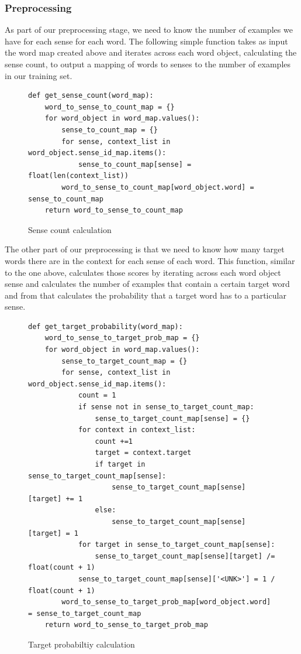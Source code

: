 \documentclass[11pt]{article}
\begin{document}
\subsubsection{Preprocessing}
As part of our preprocessing stage, we need to know the number of examples we have for each sense for each word. The following simple function takes as input the word map created above and iterates across each word object, calculating the sense count, to output a mapping of words to senses to the number of examples in our training set.

\begin{figure}[ht]
\begin{lstlisting}
def get_sense_count(word_map):
    word_to_sense_to_count_map = {}
    for word_object in word_map.values():
        sense_to_count_map = {}
        for sense, context_list in word_object.sense_id_map.items():
            sense_to_count_map[sense] = float(len(context_list))
        word_to_sense_to_count_map[word_object.word] = sense_to_count_map
    return word_to_sense_to_count_map
\end{lstlisting}
\caption{Sense count calculation}
\label{sense count}
\end{figure}

The other part of our preprocessing is that we need to know how many target words there are in the context for each sense of each word. This function, similar to the one above, calculates those scores by iterating across each word object sense and calculates the number of examples that contain a certain target word and from that calculates the probability that a target word has to a particular sense.

\begin{figure}[ht]
\begin{lstlisting}
def get_target_probability(word_map):
    word_to_sense_to_target_prob_map = {}
    for word_object in word_map.values():
        sense_to_target_count_map = {}
        for sense, context_list in word_object.sense_id_map.items():
            count = 1
            if sense not in sense_to_target_count_map:
                sense_to_target_count_map[sense] = {}
            for context in context_list:
                count +=1
                target = context.target
                if target in sense_to_target_count_map[sense]:
                    sense_to_target_count_map[sense][target] += 1
                else:
                    sense_to_target_count_map[sense][target] = 1
            for target in sense_to_target_count_map[sense]:
                sense_to_target_count_map[sense][target] /= float(count + 1)
            sense_to_target_count_map[sense]['<UNK>'] = 1 / float(count + 1)
        word_to_sense_to_target_prob_map[word_object.word] = sense_to_target_count_map
    return word_to_sense_to_target_prob_map
\end{lstlisting}
\caption{Target probabiltiy calculation}
\label{target probabiltiy}
\end{figure}
\end{document}
